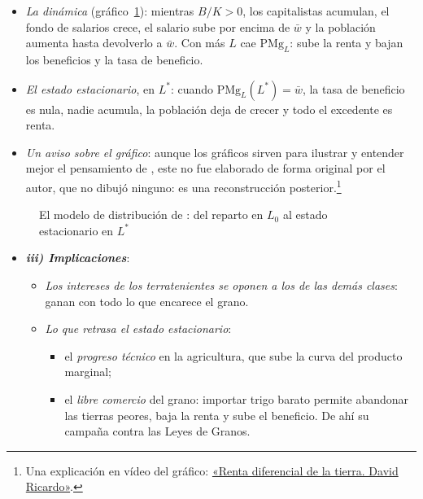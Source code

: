 \documentclass[11pt]{article}
\begin{document}
\begin{itemize}
\begin{itemize}
    \begin{equation}\label{eq:beneficio-ricardo}
    \frac{B}{K}=\frac{(\mathrm{PMg}_L-\bar w)\,L}{\bar w\,L}=\frac{\mathrm{PMg}_L-\bar w}{\bar w}
    \end{equation}
  \item \emph{La dinámica} (gráfico~\ref{fig:ricardo}): mientras $B/K>0$, los capitalistas acumulan, el fondo de salarios crece, el salario sube por encima de $\bar w$ y la población aumenta hasta devolverlo a $\bar w$. Con más $L$ cae $\mathrm{PMg}_L$: sube la renta y bajan los beneficios y la tasa de beneficio.
  \item \emph{El estado estacionario}, en $L^*$: cuando $\mathrm{PMg}_L(L^*)=\bar w$, la tasa de beneficio es nula, nadie acumula, la población deja de crecer y todo el excedente es renta.
  \item \emph{Un aviso sobre el gráfico}: aunque los gráficos sirven para ilustrar y entender mejor el pensamiento de , este no fue elaborado de forma original por el autor, que no dibujó ninguno: es una reconstrucción posterior.\footnote{Una explicación en vídeo del gráfico: \href{https://www.youtube.com/watch?v=wVbG39oIcpI}{«Renta diferencial de la tierra. David Ricardo»}.}
  \end{itemize}
\end{itemize}
\begin{figure}[H]
\centering
\caption{El modelo de distribución de : del reparto en $L_0$ al estado estacionario en $L^*$}\label{fig:ricardo}
\end{figure}
\begin{itemize}
\item \textbf{\emph{iii) Implicaciones}}:
  \begin{itemize}
  \item \emph{Los intereses de los terratenientes se oponen a los de las demás clases}: ganan con todo lo que encarece el grano.
  \item \emph{Lo que retrasa el estado estacionario}:
    \begin{itemize}
    \item el \emph{progreso técnico} en la agricultura, que sube la curva del producto marginal;
    \item el \emph{libre comercio} del grano: importar trigo barato permite abandonar las tierras peores, baja la renta y sube el beneficio. De ahí su campaña contra las Leyes de Granos.
    \end{itemize}
  \end{itemize}
\end{itemize}
\end{document}
